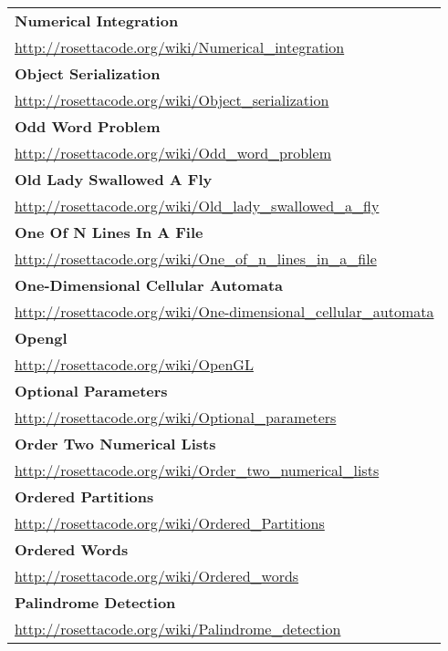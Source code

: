 \begin{longtable}{l}
\textbf{Numerical Integration } \\ \href{http://rosettacode.org/wiki/Numerical\_integration}{http://rosettacode.org/wiki/Numerical\_integration} \\
\textbf{
Object Serialization } \\ \href{http://rosettacode.org/wiki/Object\_serialization}{http://rosettacode.org/wiki/Object\_serialization} \\
\textbf{Odd Word Problem } \\ \href{http://rosettacode.org/wiki/Odd\_word\_problem}{http://rosettacode.org/wiki/Odd\_word\_problem} \\
\textbf{Old Lady Swallowed A Fly } \\ \href{http://rosettacode.org/wiki/Old\_lady\_swallowed\_a\_fly}{http://rosettacode.org/wiki/Old\_lady\_swallowed\_a\_fly} \\
\textbf{
One Of N Lines In A File } \\ \href{http://rosettacode.org/wiki/One\_of\_n\_lines\_in\_a\_file}{http://rosettacode.org/wiki/One\_of\_n\_lines\_in\_a\_file} \\
\textbf{One-Dimensional Cellular Automata } \\ \href{http://rosettacode.org/wiki/One-dimensional\_cellular\_automata}{http://rosettacode.org/wiki/One-dimensional\_cellular\_automata} \\
\textbf{
Opengl } \\ \href{http://rosettacode.org/wiki/OpenGL}{http://rosettacode.org/wiki/OpenGL} \\
\textbf{Optional Parameters } \\ \href{http://rosettacode.org/wiki/Optional\_parameters}{http://rosettacode.org/wiki/Optional\_parameters} \\
\textbf{Order Two Numerical Lists } \\ \href{http://rosettacode.org/wiki/Order\_two\_numerical\_lists}{http://rosettacode.org/wiki/Order\_two\_numerical\_lists} \\
\textbf{
Ordered Partitions } \\ \href{http://rosettacode.org/wiki/Ordered\_Partitions}{http://rosettacode.org/wiki/Ordered\_Partitions} \\
\textbf{Ordered Words } \\ \href{http://rosettacode.org/wiki/Ordered\_words}{http://rosettacode.org/wiki/Ordered\_words} \\
\textbf{Palindrome Detection } \\ \href{http://rosettacode.org/wiki/Palindrome\_detection}{http://rosettacode.org/wiki/Palindrome\_detection} \\

\end{longtable}
